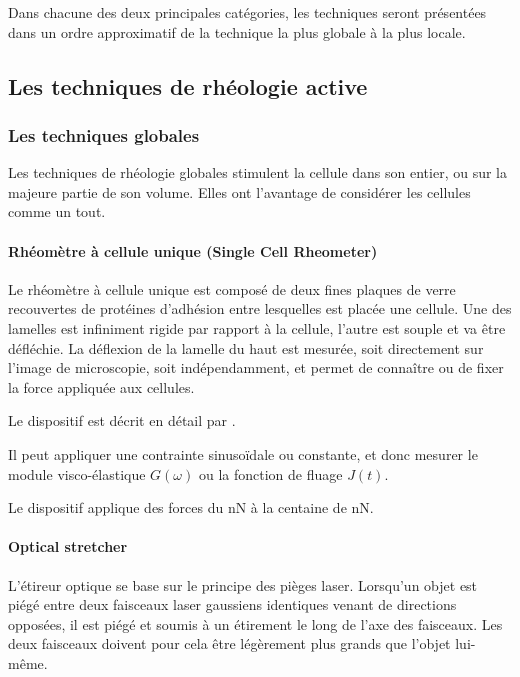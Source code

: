 Dans chacune des deux principales catégories, les techniques seront présentées dans un ordre approximatif de la technique la plus globale à la plus locale. 

\subsection{Les techniques de rhéologie active}
\subsubsection{Les techniques globales}
Les techniques de rhéologie globales stimulent la cellule dans son entier, ou sur la majeure partie de son volume. Elles ont l'avantage de considérer les cellules comme un tout. 

\paragraph{Rhéomètre à cellule unique (Single Cell Rheometer)}

Le rhéomètre à cellule unique est composé de deux fines plaques de verre recouvertes de protéines d'adhésion entre lesquelles est placée une cellule. Une des lamelles est infiniment rigide par rapport à la cellule, l'autre est souple et va être défléchie. 
La déflexion de la lamelle du haut est mesurée, soit directement sur l'image de microscopie, soit indépendamment, et permet de connaître ou de fixer la force appliquée aux cellules. 

Le dispositif est décrit en détail par \cite{bufi_single-cell_2015}. 




Il peut appliquer une contrainte sinusoïdale ou constante, et donc mesurer le module visco-élastique $G(\omega)$ ou la fonction de fluage $J(t)$. 

Le dispositif applique des forces du nN à la centaine de nN.



\paragraph{Optical stretcher}

L'étireur optique se base sur le principe des pièges laser.
Lorsqu'un objet est piégé entre deux faisceaux laser gaussiens identiques venant de directions opposées, il est piégé et soumis à un étirement le long de l'axe des faisceaux. 
Les deux faisceaux doivent pour cela être légèrement plus grands que l'objet lui-même. 

